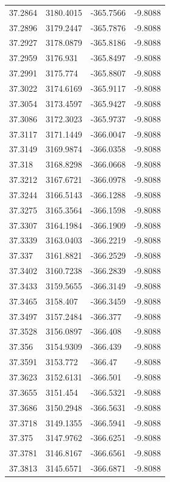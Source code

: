 \begin{table}[H]
\begin{tabular}{llll}
37.2864 & 3180.4015 & -365.7566 & -9.8088 \\
37.2896 & 3179.2447 & -365.7876 & -9.8088 \\
37.2927 & 3178.0879 & -365.8186 & -9.8088 \\
37.2959 & 3176.931 & -365.8497 & -9.8088 \\
37.2991 & 3175.774 & -365.8807 & -9.8088 \\
37.3022 & 3174.6169 & -365.9117 & -9.8088 \\
37.3054 & 3173.4597 & -365.9427 & -9.8088 \\
37.3086 & 3172.3023 & -365.9737 & -9.8088 \\
37.3117 & 3171.1449 & -366.0047 & -9.8088 \\
37.3149 & 3169.9874 & -366.0358 & -9.8088 \\
37.318 & 3168.8298 & -366.0668 & -9.8088 \\
37.3212 & 3167.6721 & -366.0978 & -9.8088 \\
37.3244 & 3166.5143 & -366.1288 & -9.8088 \\
37.3275 & 3165.3564 & -366.1598 & -9.8088 \\
37.3307 & 3164.1984 & -366.1909 & -9.8088 \\
37.3339 & 3163.0403 & -366.2219 & -9.8088 \\
37.337 & 3161.8821 & -366.2529 & -9.8088 \\
37.3402 & 3160.7238 & -366.2839 & -9.8088 \\
37.3433 & 3159.5655 & -366.3149 & -9.8088 \\
37.3465 & 3158.407 & -366.3459 & -9.8088 \\
37.3497 & 3157.2484 & -366.377 & -9.8088 \\
37.3528 & 3156.0897 & -366.408 & -9.8088 \\
37.356 & 3154.9309 & -366.439 & -9.8088 \\
37.3591 & 3153.772 & -366.47 & -9.8088 \\
37.3623 & 3152.6131 & -366.501 & -9.8088 \\
37.3655 & 3151.454 & -366.5321 & -9.8088 \\
37.3686 & 3150.2948 & -366.5631 & -9.8088 \\
37.3718 & 3149.1355 & -366.5941 & -9.8088 \\
37.375 & 3147.9762 & -366.6251 & -9.8088 \\
37.3781 & 3146.8167 & -366.6561 & -9.8088 \\
37.3813 & 3145.6571 & -366.6871 & -9.8088 \\

\end{tabular}
\end{table}
